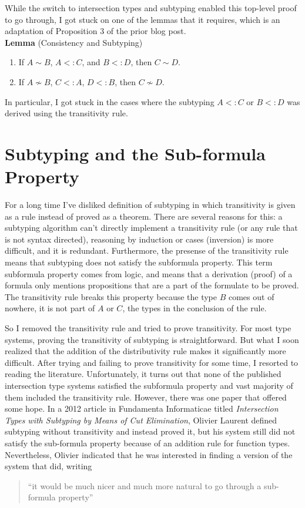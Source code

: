 \documentclass{article}
\begin{document}
While the switch to intersection types and subtyping enabled this
top-level proof to go through, I got stuck on one of the lemmas that
it requires, which is an adaptation of Proposition 3 of the prior blog
post. \\

\noindent \textbf{Lemma} (Consistency and Subtyping)
\begin{enumerate}
\item  If $A \sim B$, $A <: C$, and $B <: D$,
  then $C \sim D$.
\item If $A \not\sim B$, $C <: A$, $D <: B$, then $C \not\sim D$.
\end{enumerate}
In particular, I got stuck in the cases where the subtyping $A <: C$
or $B <: D$ was derived using the transitivity rule.

\section{Subtyping and the Sub-formula Property}

For a long time I've disliked definition of subtyping in which
transitivity is given as a rule instead of proved as a theorem.  There
are several reasons for this: a subtyping algorithm can't directly
implement a transitivity rule (or any rule that is not syntax
directed), reasoning by induction or cases (inversion) is more
difficult, and it is redundant. Furthermore, the presense of the
transitivity rule means that subtyping does not satisfy the subformula
property. This term subformula property comes from logic, and means
that a derivation (proof) of a formula only mentions propositions that
are a part of the formulate to be proved. The transitivity rule breaks
this property because the type $B$ comes out of nowhere, it is not
part of $A$ or $C$, the types in the conclusion of the rule.

So I removed the transitivity rule and tried to prove transitivity.
For most type systems, proving the transitivity of subtyping is
straightforward. But what I soon realized that the addition of the
distributivity rule makes it significantly more difficult.  After
trying and failing to prove transitivity for some time, I resorted to
reading the literature. Unfortunately, it turns out that none of the
published intersection type systems satisfied the subformula property
and vast majority of them included the transitivity rule.  However,
there was one paper that offered some hope.  In a 2012 article in
Fundamenta Informaticae titled \emph{Intersection Types with Subtyping
  by Means of Cut Elimination}, Olivier Laurent defined subtyping
without transitivity and instead proved it, but his system still did
not satisfy the sub-formula property because of an addition rule for
function types. Nevertheless, Olivier indicated that he was interested
in finding a version of the system that did, writing
\begin{quote}
``it would be much nicer and much more natural to go through a
  sub-formula property''
\end{quote}
\end{document}
